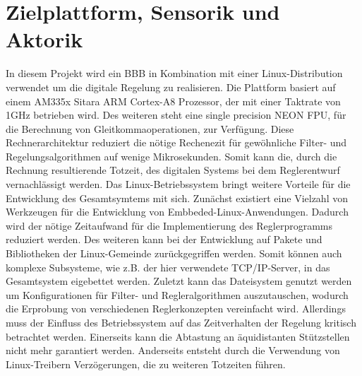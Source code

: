 \section{Zielplattform, Sensorik und Aktorik}
In diesem Projekt wird ein \ac{BBB} in Kombination mit einer Linux-Distribution verwendet um die digitale Regelung zu realisieren. Die Plattform basiert auf einem AM335x Sitara ARM Cortex-A8 Prozessor, der mit einer Taktrate von 1GHz betrieben wird. Des weiteren steht eine single precision NEON FPU, für die Berechnung von Gleitkommaoperationen, zur Verfügung. Diese Rechnerarchitektur reduziert die nötige Rechenezit für gewöhnliche Filter- und Regelungsalgorithmen auf wenige Mikrosekunden. Somit kann die, durch die Rechnung resultierende Totzeit, des digitalen Systems bei dem Reglerentwurf vernachlässigt werden.
Das Linux-Betriebssystem bringt weitere Vorteile für die Entwicklung des Gesamtsymtems mit sich. Zunächst existiert eine Vielzahl von Werkzeugen für die Entwicklung von Embbeded-Linux-Anwendungen. Dadurch wird der nötige Zeitaufwand für die Implementierung des Reglerprogramms reduziert werden. Des weiteren kann bei der Entwicklung auf Pakete und Bibliotheken der Linux-Gemeinde zurückgegriffen werden. Somit können auch komplexe Subsysteme, wie z.B. der hier verwendete TCP/IP-Server, in das Gesamtsystem eigebettet werden. Zuletzt kann das Dateisystem genutzt werden um Konfigurationen für Filter- und Regleralgorithmen auszutauschen, wodurch die Erprobung von verschiedenen Reglerkonzepten vereinfacht wird. 
Allerdings muss der Einfluss des Betriebssystem auf das Zeitverhalten der Regelung kritisch betrachtet werden. Einerseits kann die Abtastung an äquidistanten Stützstellen nicht mehr garantiert werden. Anderseits entsteht durch die Verwendung von Linux-Treibern Verzögerungen, die zu weiteren Totzeiten führen.

